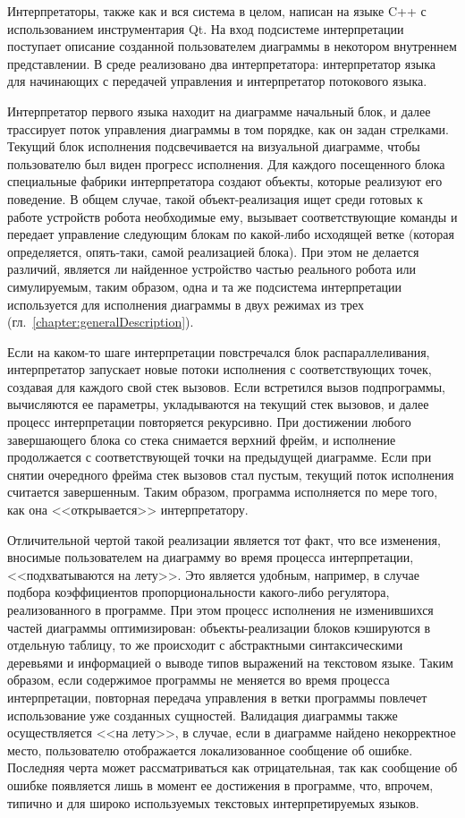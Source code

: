 \documentclass[conference]{IEEEtran}
\begin{document}
Интерпретаторы, также как и вся система в целом, написан на языке C++ с использованием инструментария Qt. На вход подсистеме интерпретации поступает
описание созданной пользователем диаграммы в некотором внутреннем представлении. В среде реализовано два интерпретатора: интерпретатор языка для начинающих с передачей управления и интерпретатор потокового языка.

Интерпретатор первого языка находит на диаграмме начальный блок, и далее трассирует поток управления диаграммы в том порядке, как он задан стрелками. Текущий блок исполнения подсвечивается на визуальной диаграмме, чтобы пользователю был виден прогресс исполнения. Для каждого посещенного блока специальные фабрики интерпретатора создают объекты, которые реализуют его поведение. В общем случае, такой объект-реализация ищет среди готовых к работе устройств робота необходимые ему, вызывает соответствующие команды и передает управление следующим блокам по какой-либо исходящей ветке (которая определяется, опять-таки, самой реализацией блока). При этом не делается различий, является ли найденное устройство частью реального робота или симулируемым, таким образом, одна и та же подсистема интерпретации используется для исполнения диаграммы в двух режимах из трех (гл.~\ref{chapter:generalDescription}).

Если на каком-то шаге интерпретации повстречался блок распараллеливания, интерпретатор запускает новые потоки исполнения с соответствующих точек, создавая для каждого свой стек вызовов. Если встретился вызов подпрограммы, вычисляются ее параметры, укладываются на текущий стек вызовов, и далее процесс интерпретации повторяется рекурсивно. При достижении любого завершающего блока со стека снимается верхний фрейм, и исполнение продолжается с соответствующей точки на предыдущей диаграмме. Если при снятии очередного фрейма стек вызовов стал пустым, текущий поток исполнения считается завершенным. Таким образом, программа исполняется по мере того, как она <<открывается>> интерпретатору.

Отличительной чертой такой реализации является тот факт, что все изменения, вносимые пользователем на диаграмму во время процесса интерпретации, <<подхватываются на лету>>. Это является удобным, например, в случае подбора коэффициентов пропорциональности какого-либо регулятора, реализованного в программе. При этом процесс исполнения не изменившихся частей диаграммы оптимизирован: объекты-реализации блоков кэшируются в отдельную таблицу, то же происходит с абстрактными синтаксическими деревьями и информацией о выводе типов выражений на текстовом языке. Таким образом, если содержимое программы не меняется во время процесса интерпретации, повторная передача управления в ветки программы повлечет использование уже созданных сущностей. Валидация диаграммы также осуществляется <<на лету>>, в случае, если в диаграмме найдено некорректное место, пользователю отображается локализованное сообщение об ошибке. Последняя черта может рассматриваться как отрицательная, так как сообщение об ошибке появляется лишь в момент ее достижения в программе, что, впрочем, типично и для широко используемых текстовых интерпретируемых языков.
\end{document}
